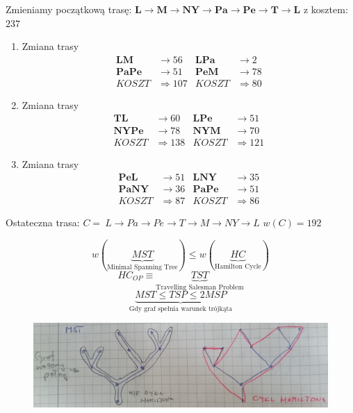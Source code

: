 \begin{example*}
Zmieniamy początkową trasę: $\textbf{L}\rightarrow \textbf{M}\rightarrow \textbf{NY}\rightarrow \textbf{Pa}\rightarrow \textbf{Pe}\rightarrow \textbf{T} \rightarrow \textbf{L}$ z kosztem: $237$
\begin{enumerate}
\item Zmiana trasy
\begin{align*}
\textbf{LM}&\rightarrow 56 & \textbf{LPa}&\rightarrow 2\\
\textbf{PaPe}&\rightarrow 51 & \textbf{PeM}&\rightarrow 78\\
KOSZT &\Rightarrow 107 & KOSZT &\Rightarrow 80
\end{align*}
\item Zmiana trasy
\begin{align*}
\textbf{TL}&\rightarrow 60 & \textbf{LPe}&\rightarrow 51\\
\textbf{NYPe}&\rightarrow 78 & \textbf{NYM}&\rightarrow 70\\
KOSZT &\Rightarrow 138 & KOSZT &\Rightarrow 121
\end{align*}
\item Zmiana trasy
\begin{align*}
\textbf{PeL}&\rightarrow 51 & \textbf{LNY}&\rightarrow 35\\
\textbf{PaNY}&\rightarrow 36 & \textbf{PaPe}&\rightarrow 51\\
KOSZT &\Rightarrow 87 & KOSZT &\Rightarrow 86
\end{align*}
\end{enumerate}
Ostateczna trasa: $C=\ L\rightarrow Pa\rightarrow Pe\rightarrow T\rightarrow M\rightarrow NY\rightarrow L$ $w(C)=192$
\end{example*}

$$w(\underbrace{MST}_{\text{Minimal Spanning Tree}})\leq w(\underbrace{HC}_{\text{Hamilton Cycle}})$$
$$HC_{OP} \equiv \underbrace{TST}_{\text{Travelling Salesman Problem}}$$
$$\underbrace{MST \leq TSP \leq 2 MSP}_{\text{Gdy graf spełnia warunek trójkąta}}$$

\begin{figure}[H]
\centering
\includegraphics[width=.9\textwidth]{img/g8}
\end{figure}

